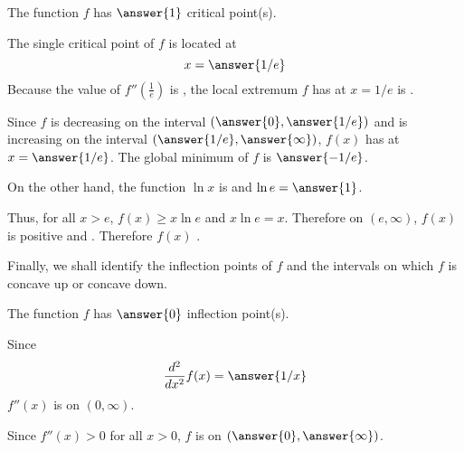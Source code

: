 \documentclass{ximera}
\begin{document}
\begin{exercise}
\begin{exercise}
\begin{exercise}
\begin{exercise}
\begin{exercise}
\begin{exercise}
The function $f$ has $\answer{1}$ critical point(s). 
\begin{exercise}
The single critical point of $f$ is located at
\[
x=\answer{1/e}
\]
Because the value of $f''(\frac{1}{e})$ is , the local extremum $f$ has at $x=1/e$ is .
\begin{exercise}
Since $f$ is decreasing on the interval $(\answer{0},\answer{1/e})$ and is increasing on the interval $(\answer{1/e},\answer{\infty})$, $f(x)$ has  at $x=\answer{1/e}$. The global minimum of $f$ is $\answer{-1/e}$.
\begin{exercise}
On the other hand, the function $\ln x$ is  and $\ln e=\answer{1}$. 
\begin{exercise}
Thus, for all $x>e$, $f(x)\ge x\ln e$ and $x\ln e=x$. Therefore on $(e,\infty)$, $f(x)$ is positive and  . Therefore $f(x)$ .
\begin{exercise}
Finally, we shall identify the inflection points of $f$ and the intervals on which $f$ is concave up or concave down.

The function $f$ has $\answer{0}$ inflection point(s).
\begin{exercise}
Since
\[
\frac{d^2}{dx^2}f(x)=\answer{1/x}
\]
$f''(x)$ is  on $(0,\infty)$. 
\begin{exercise}
Since $f''(x)>0$ for all $x>0$, $f$ is  on $(\answer{0},\answer{\infty})$.
\end{exercise}
\end{exercise}
\end{exercise}
\end{exercise}
\end{exercise}
\end{exercise}
\end{exercise}
\end{exercise}
\end{exercise}
\end{exercise}
\end{exercise}
\end{exercise}
\end{exercise}
\end{document}
